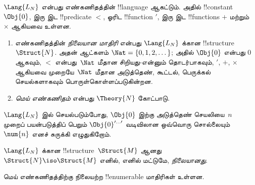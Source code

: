 \documentclass[11pt,a4paper,openany]{memoir}
\begin{document}
\begin{defn}
$\Lang{L_N}$ என்பது எண்கணிதத்தின் !!{language} ஆகட்டும். அதில்
!!{constant} $\Obj{0}$, இரு இட !!{predicate} $<$, ஓரிட
!!{function} $\prime$, இரு இட !!{function}s $+$ மற்றும் $\times$
ஆகியவை உள்ளன.
\begin{enumerate}
\item எண்கணிதத்தின் \emph{நிலையான மாதிரி} என்பது $\Lang{L_N}$
  க்கான !!{structure}~$\Struct{N}$. அதன் ஆட்களம்
  $\Nat = \{ 0, 1, 2, \dots\}$; அதில் $\Obj{0}$ என்பது $0$ ஆகவும்,
  $<$ என்பது~$\Nat$ மீதான சிறியது-என்னும் தொடர்பாகவும்,
  $\prime$, $+$, $\times$ ஆகியவை முறையே~$\Nat$ மீதான
  அடுத்தெண், கூட்டல், பெருக்கல் செயல்களாகவும் பொருள்கொள்ளப்படுகின்றன.
\item \emph{மெய் எண்கணிதம்} என்பது $\Theory{N}$ கோட்பாடு.
\end{enumerate}
\end{defn}

$\Lang{L_N}$ இல் செயல்படும்போது, $\Obj{0}$ இற்கு அடுத்தெண்
செயலியை~$n$ முறைப் பயன்படுத்திப் பெறும்
$\Obj{0}^{\prime\dots\prime}$ வடிவிலான ஒவ்வொரு சொல்லையும்
$\num{n}$ எனச் சுருக்கி எழுதுகிறோம்.

\begin{defn}
$\Lang{L_N}$ க்கான !!{structure}~$\Struct{M}$ ஆனது
$\Struct{N} \iso \Struct{M}$ எனில், எனில் மட்டுமே,
\emph{நிலையானது}.
\end{defn}

\begin{thm}
மெய் எண்கணிதத்திற்கு நிலையற்ற !!{enumerable}
மாதிரிகள் உள்ளன.
\end{thm}
\end{document}
